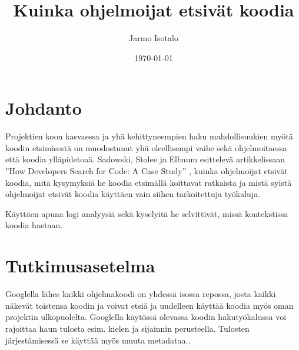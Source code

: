 \documentclass[finnish]{../tktltiki2}
\title{Kuinka ohjelmoijat etsivät koodia}
\author{Jarmo Isotalo}
\date{\today}
\theoremstyle{definition}
\theoremstyle{remark}
\begin{document}

\frontmatter      %

\maketitle        %

\tableofcontents  %


\mainmatter       %

\section{Johdanto}

Projektien koon kasvaessa ja yhä kehittyneempien haku mahdollisuukien myötä koodin etsimisestä on muodostunut yhä oleellisempi vaihe sekä ohjelmoitaessa että koodia ylläpidetoaä. Sadowski, Stolee ja Elbaum esittelevä artikkelissaan ''How Developers Search for Code: A Case Study'' \cite{g_search_code} , kuinka ohjelmoijat etsivät koodia, mitä kysymyksiä he koodia etsimällä koittavat ratkaista ja mistä syistä ohjelmoijat etsivät koodia käyttäen vain siihen tarkoitettuja työkaluja.

Käyttäen apuna logi analyysiä sekä kyselyitä he selvittivät, missä kontekstissa koodia haetaan.



\section{Tutkimusasetelma}

Googlella lähes kaikki ohjelmakoodi on yhdessä isossa repossa, josta kaikki näkevät toistensa koodin ja voivat etsiä ja uudelleen käyttää koodia myös oman projektin ulkopuolelta. Googlella käytössä olevassa koodin hakutyökalussa voi rajoittaa haun tulosta esim. kielen ja sijainnin perusteella. Tulosten järjestämisessä se käyttää myös muuta metadataa..
\end{document}
